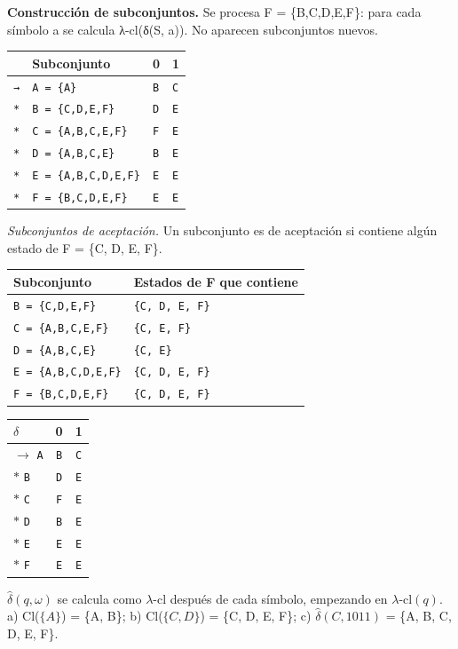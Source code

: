\documentclass[11pt]{article}
\begin{document}
\textbf{Construcción de subconjuntos.} Se procesa F = \{B,C,D,E,F\}: para cada símbolo a se calcula λ-cl(δ(S, a)). No aparecen subconjuntos nuevos.
\begin{center}\footnotesize\begin{tabular}{llll}\toprule
 & Subconjunto & 0 & 1 \\\midrule
\texttt{→} & \texttt{A = \{A\}} & \texttt{B} & \texttt{C} \\
\texttt{*} & \texttt{B = \{C,D,E,F\}} & \texttt{D} & \texttt{E} \\
\texttt{*} & \texttt{C = \{A,B,C,E,F\}} & \texttt{F} & \texttt{E} \\
\texttt{*} & \texttt{D = \{A,B,C,E\}} & \texttt{B} & \texttt{E} \\
\texttt{*} & \texttt{E = \{A,B,C,D,E,F\}} & \texttt{E} & \texttt{E} \\
\texttt{*} & \texttt{F = \{B,C,D,E,F\}} & \texttt{E} & \texttt{E} \\
\bottomrule\end{tabular}\end{center}
\textit{Subconjuntos de aceptación.} Un subconjunto es de aceptación si contiene algún estado de F = \{C, D, E, F\}.
\begin{center}\footnotesize\begin{tabular}{ll}\toprule
Subconjunto & Estados de F que contiene \\\midrule
\texttt{B = \{C,D,E,F\}} & \texttt{\{C, D, E, F\}} \\
\texttt{C = \{A,B,C,E,F\}} & \texttt{\{C, E, F\}} \\
\texttt{D = \{A,B,C,E\}} & \texttt{\{C, E\}} \\
\texttt{E = \{A,B,C,D,E,F\}} & \texttt{\{C, D, E, F\}} \\
\texttt{F = \{B,C,D,E,F\}} & \texttt{\{C, D, E, F\}} \\
\bottomrule\end{tabular}\end{center}
\begin{center}\small\begin{tabular}{lcc}\toprule
$\delta$ & 0 & 1 \\\midrule
$\to$ \texttt{A} & \texttt{B} & \texttt{C} \\
$*$ \texttt{B} & \texttt{D} & \texttt{E} \\
$*$ \texttt{C} & \texttt{F} & \texttt{E} \\
$*$ \texttt{D} & \texttt{B} & \texttt{E} \\
$*$ \texttt{E} & \texttt{E} & \texttt{E} \\
$*$ \texttt{F} & \texttt{E} & \texttt{E} \\
\bottomrule\end{tabular}\end{center}
$\hat\delta(q, \omega)$ se calcula como $\lambda$-cl después de cada símbolo, empezando en $\lambda$-cl$(q)$.
\resp a) Cl($\{A\}$) = \{A, B\}; b) Cl($\{C, D\}$) = \{C, D, E, F\}; c) $\hat\delta(C, 1011)$ = \{A, B, C, D, E, F\}.
\end{document}
